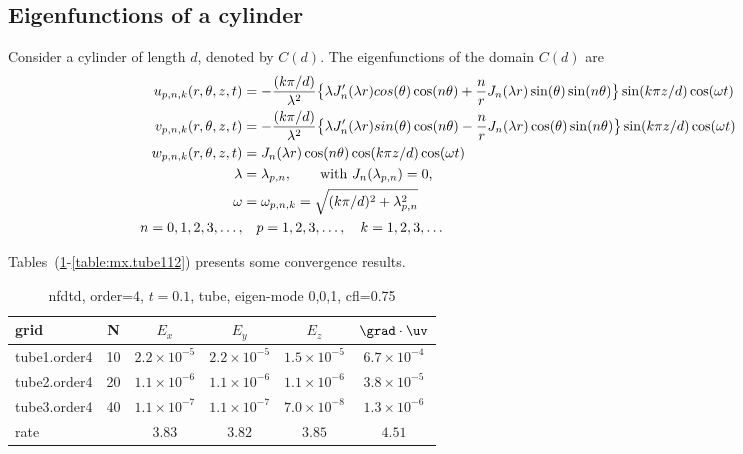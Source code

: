 \subsection{Eigenfunctions of a cylinder}

Consider a cylinder of length $d$, denoted by $C(d)$.
The eigenfunctions of the domain $C(d)$ are
\begin{align*}
  u_{p,n,k}(r,\theta,z,t) &= - { (k\pi/d) \over \lambda^2 }
       \big\{ 
           \lambda J_n'(\lambda r ) cos(\theta)\cos(n \theta) 
                        + {n\over r} J_n(\lambda r ) \sin(\theta) \sin(n \theta)  \big\} 
               \sin(k \pi z/d)  \cos(\omega t)  \\
  v_{p,n,k}(r,\theta,z,t) &=   -{ (k\pi/d) \over \lambda^2} 
      \big\{ \lambda J_n'(\lambda r) sin(\theta)\cos(n \theta)
                 - {n\over r} J_n(\lambda r ) \cos(\theta) \sin(n \theta)  \big\}  
                          \sin(k \pi z/d)  \cos(\omega t) \\
  w_{p,n,k}(r,\theta,z,t) & = J_n( \lambda r ) \cos(n \theta) \cos(k \pi z/d) \cos(\omega t) \\
       \lambda &= \lambda_{p,n}, \qquad \mbox{with $J_n(\lambda_{p,n})=0$,} \\
       \omega &= \omega_{p,n,k} = \sqrt{(k\pi/d)^2 + \lambda_{p,n}^2} \\
        n=0,1,2,3,\ldots,&\quad p=1,2,3,\ldots,\quad k=1,2,3,\ldots
\end{align*}

Tables~(\ref{table:mx.tube001}-\ref{table:mx.tube112}) presents some convergence results.

\begin{table}[hbt]
\begin{center}
\begin{tabular}{|l|c|c|c|c|c|} \hline\hline 
grid  & N &  $E_x$ &  $E_y$ & $E_z$ & $\grad\cdot\uv$\\ \hline 
        tube1.order4 &    10 &  $2.2\times10^{ -5}$  &  $2.2\times10^{ -5}$  &  $1.5\times10^{ -5}$  &  $6.7\times10^{ -4}$   \\ \hline
        tube2.order4 &    20 &  $1.1\times10^{ -6}$  &  $1.1\times10^{ -6}$  &  $1.1\times10^{ -6}$  &  $3.8\times10^{ -5}$   \\ \hline
        tube3.order4 &    40 &  $1.1\times10^{ -7}$  &  $1.1\times10^{ -7}$  &  $7.0\times10^{ -8}$  &  $1.3\times10^{ -6}$   \\ \hline
    rate            &     &       $3.83$ &       $3.82$ &       $3.85$ &       $4.51$  \\ \hline\hline
\end{tabular}
\caption{nfdtd, order=$4$, $t=0.1$, tube, eigen-mode 0,0,1, cfl=0.75}\label{table:mx.tube001}
\end{center}
\end{table}

